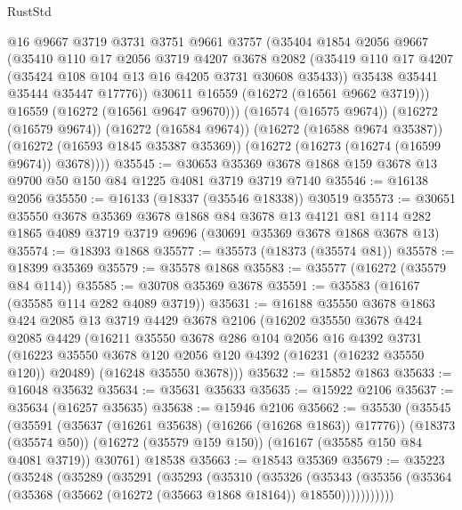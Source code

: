 \begin{lexlean}{RustStd}
\begin{coremodule}
            @16
            @9667
            @3719
            @3731
            @3751
            @9661
            @3757
            (@35404
              @1854
              @2056
              @9667
              (@35410
                @110
                @17
                @2056
                @3719
                @4207
                @3678
                @2082
                (@35419 @110 @17 @4207 (@35424 @108 @104 @13 @16 @4205 @3731 @30608 @35433))
                @35438
                @35441
                @35444
                @35447
                @17776))
            @30611
            @16559
            (@16272 (@16561 @9662 @3719)))
          @16559
          (@16272 (@16561 @9647 @9670)))
        (@16574 (@16575 @9674))
        (@16272 (@16579 @9674))
        (@16272 (@16584 @9674))
        (@16272 (@16588 @9674 @35387))
        (@16272 (@16593 @1845 @35387 @35369))
        (@16272 (@16273 (@16274 (@16599 @9674)) @3678))))
@35545 := @30653 @35369 @3678 @1868 @159 @3678 @13 @9700 @50 @150 @84 @1225 @4081 @3719 @3719 @7140
@35546 := @16138 @2056
@35550 := @16133 (@18337 (@35546 @18338)) @30519
@35573 := @30651
    @35550
    @3678
    @35369
    @3678
    @1868
    @84
    @3678
    @13
    @4121
    @81
    @114
    @282
    @1865
    @4089
    @3719
    @3719
    @9696
    (@30691 @35369 @3678 @1868 @3678 @13)
@35574 := @18393 @1868
@35577 := @35573 (@18373 (@35574 @81))
@35578 := @18399 @35369
@35579 := @35578 @1868
@35583 := @35577 (@16272 (@35579 @84 @114))
@35585 := @30708 @35369 @3678
@35591 := @35583 (@16167 (@35585 @114 @282 @4089 @3719))
@35631 := @16188
    @35550
    @3678
    @1863
    @424
    @2085
    @13
    @3719
    @4429
    @3678
    @2106
    (@16202
      @35550
      @3678
      @424
      @2085
      @4429
      (@16211
        @35550
        @3678
        @286
        @104
        @2056
        @16
        @4392
        @3731
        (@16223 @35550 @3678 @120 @2056 @120 @4392 (@16231 (@16232 @35550 @120)) @20489)
        (@16248 @35550 @3678)))
@35632 := @15852 @1863
@35633 := @16048 @35632
@35634 := @35631 @35633
@35635 := @15922 @2106
@35637 := @35634 (@16257 @35635)
@35638 := @15946 @2106
@35662 := @35530
    (@35545
      (@35591 (@35637 (@16261 @35638) (@16266 (@16268 @1863)) @17776))
      (@18373 (@35574 @50))
      (@16272 (@35579 @159 @150))
      (@16167 (@35585 @150 @84 @4081 @3719))
      @30761)
    @18538
@35663 := @18543 @35369
@35679 := @35223
    (@35248
      (@35289
        (@35291
          (@35293
            (@35310
              (@35326
                (@35343
                  (@35356 (@35364 (@35368 (@35662 (@16272 (@35663 @1868 @18164)) @18550)))))))))))

\end{coremodule}
\end{lexlean}
